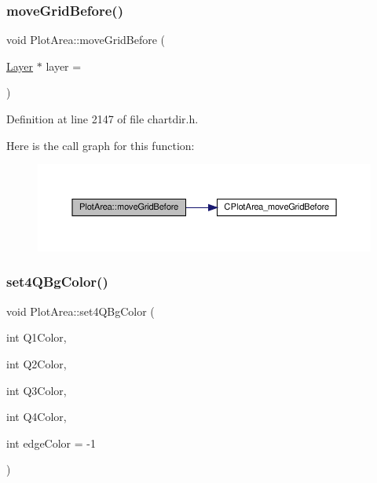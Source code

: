 \subsubsection{\texorpdfstring{move\+Grid\+Before()}{moveGridBefore()}}
{\footnotesize\ttfamily void Plot\+Area\+::move\+Grid\+Before (\begin{DoxyParamCaption}\item[{\hyperlink{class_layer}{Layer} $\ast$}]{layer = {} }\end{DoxyParamCaption})\hspace{0.3cm}{\ttfamily [inline]}}



Definition at line 2147 of file chartdir.\+h.

Here is the call graph for this function\+:
\nopagebreak
\begin{figure}[H]
\begin{center}
\leavevmode
\includegraphics[width=350pt]{class_plot_area_ac00dbf72a76b6c88f3edbe1f74c21550_cgraph}
\end{center}
\end{figure}
\mbox{\label{class_plot_area_a63d453fecea4dd5f9cfdabf43602d3f8}} 
\subsubsection{\texorpdfstring{set4\+Q\+Bg\+Color()}{set4QBgColor()}}
{\footnotesize\ttfamily void Plot\+Area\+::set4\+Q\+Bg\+Color (\begin{DoxyParamCaption}\item[{int}]{Q1\+Color,  }\item[{int}]{Q2\+Color,  }\item[{int}]{Q3\+Color,  }\item[{int}]{Q4\+Color,  }\item[{int}]{edge\+Color = {\ttfamily -\/1} }\end{DoxyParamCaption})\hspace{0.3cm}{\ttfamily [inline]}}



